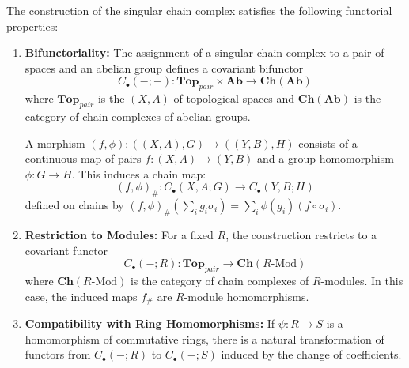 \begin{proposition} \label{proposition:functoriality_of_singular_chain_complex_of_topological_spaces_with_coefficients_in_abelian_groups}
    \TODO{}
The construction of the singular chain complex satisfies the following functorial properties:

\begin{enumerate}
    \item \textbf{Bifunctoriality:} The assignment of a singular chain complex to a pair of spaces and an abelian group defines a covariant bifunctor
    $$C_\bullet(-; -) : \mathbf{Top}_{pair} \times \mathbf{Ab} \to \mathbf{Ch}(\mathbf{Ab})$$
    where $\mathbf{Top}_{pair}$ is the  $(X, A)$ of topological spaces and $\mathbf{Ch}(\mathbf{Ab})$ is the category of chain complexes of abelian groups. 
    
    A morphism $(f, \phi) : ((X, A), G) \to ((Y, B), H)$ consists of a continuous map of pairs $f: (X, A) \to (Y, B)$ and a group homomorphism $\phi: G \to H$. This induces a chain map:
    $$(f, \phi)_\# : C_\bullet(X, A; G) \to C_\bullet(Y, B; H)$$
    defined on chains by $(f, \phi)_\# \left( \sum_i g_i \sigma_i \right) = \sum_i \phi(g_i) (f \circ \sigma_i)$.

    \item \textbf{Restriction to Modules:} For a fixed  $R$, the construction restricts to a covariant functor
    $$C_\bullet(-; R) : \mathbf{Top}_{pair} \to \mathbf{Ch}(R\text{-Mod})$$
    where $\mathbf{Ch}(R\text{-Mod})$ is the category of chain complexes of $R$-modules. In this case, the induced maps $f_\#$ are $R$-module homomorphisms.

    \item \textbf{Compatibility with Ring Homomorphisms:} If $\psi: R \to S$ is a homomorphism of commutative rings, there is a natural transformation of functors from $C_\bullet(-; R)$ to $C_\bullet(-; S)$ induced by the change of coefficients.
\end{enumerate}
\end{proposition}